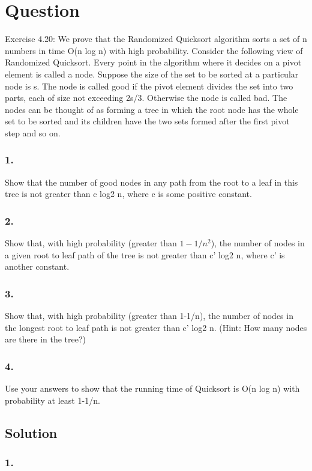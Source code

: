 \documentclass[10pt]{article}
\begin{document}
\section{Question}
Exercise 4.20: We prove that the Randomized Quicksort algorithm sorts a set of n numbers in time O(n log n) with high probability. Consider the following view of Randomized Quicksort. Every point in the algorithm where it decides on a pivot element is called a node. Suppose the size of the set to be sorted at a particular node is s. The node is called good if the pivot element divides the set into two parts, each of size not exceeding 2s/3. Otherwise the node is called bad. The nodes can be thought of as forming a tree in which the root node has the whole set to be sorted and its children have the two sets formed after the first pivot step and so on.

   \subsubsection{1.} Show that the number of good nodes in any path from the root to a leaf in this tree is not greater than c log2 n, where c is some positive constant.
   \subsubsection{2.} Show that, with high probability (greater than $1-1/n^{2}$), the number of nodes in a given root to leaf path of the tree is not greater than c' log2 n, where c' is another constant.
   \subsubsection{3.} Show that, with high probability (greater than 1-1/n), the number of nodes in the longest root to leaf path is not greater than c' log2 n. (Hint: How many nodes are there in the tree?)
   \subsubsection{4.} Use your answers to show that the running time of Quicksort is O(n log n) with probability at least 1-1/n.

\subsection{Solution}

\subsubsection{1.}
\end{document}
